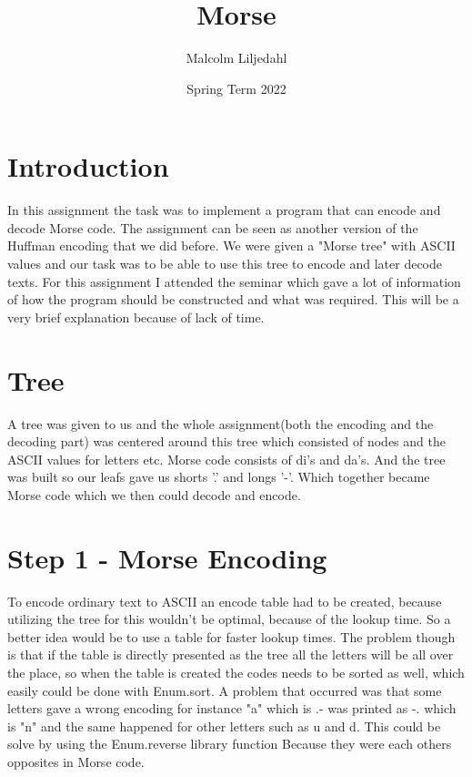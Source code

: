 \documentclass[a4paper,11pt]{article}
\begin{document}
\title{
    \textbf{Morse}
}
\author{Malcolm Liljedahl}
\date{Spring Term 2022}

\maketitle

\section*{Introduction}
In this assignment the task was to implement a program that can encode and decode Morse code. The assignment can be seen as another version of the Huffman encoding that we did before. We were given a "Morse tree" with ASCII values and our task was to be able to use this tree to encode and later decode texts. For this assignment I attended the seminar which gave a lot of information of how the program should be constructed and what was required. This will be a very brief explanation because of lack of time.

\section{Tree}
A tree was given to us and the whole assignment(both the encoding and the decoding part) was centered around this tree which consisted of nodes and the ASCII values for letters etc. Morse code consists of di's and da's. And the tree was built so our leafs gave us shorts  ’.’ and longs ’-’. Which together became Morse code which we then could decode and encode.

\section{Step 1 - Morse Encoding}
To encode ordinary text to ASCII an encode table had to be created, because utilizing the tree for this wouldn't be optimal, because of the lookup time.
So a better idea would be to use a table for faster lookup times. The problem though is that if the table is directly presented as the tree all the letters
will be all over the place, so when the table is created the codes needs to be sorted as well, which easily could be done with Enum.sort. A problem that occurred was that some letters gave a wrong encoding for instance "a" which is .- was printed as -. which is "n" and the same happened for other letters such as u and d. This could be solve by using the Enum.reverse library function Because they were each others opposites in Morse code.
\end{document}
